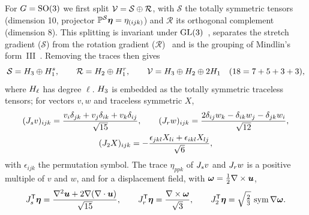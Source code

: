 For $G=\mathrm{SO}(3)$ we first split $\mathcal{V}=\mathcal S\oplus\mathcal R$, with $\mathcal S$ the
totally symmetric tensors (dimension 10, projector $\mathbb{P}^{\mathcal S}\bm{\eta}=\eta_{(ijk)}$)
and $\mathcal R$ its orthogonal complement (dimension 8). This splitting is invariant
under $\mathrm{GL}(3)$~\cite{Auffray2015,Lazar2016}, separates the stretch gradient
($\mathcal S$) from the rotation gradient ($\mathcal R$)~\cite{Auffray2015} and is the
grouping of Mindlin's form~III~\cite{MindlinEshel1968}. Removing the
traces then gives
\begin{equation}
\mathcal S=H_{3}\oplus H_{1}^{s},\qquad \mathcal R=H_{2}\oplus H_{1}^{r},\qquad
\mathcal{V}=H_{3}\oplus H_{2}\oplus2H_{1}\quad(18=7+5+3+3),\label{eq:iso-decomposition}
\end{equation}
where $H_{\ell}$ has degree $\ell$. $H_{3}$ is embedded as the totally symmetric
traceless tensors; for vectors $v,w$ and traceless symmetric $X$,
\begin{equation}
\begin{gathered}
(J_{s}v)_{ijk}=\frac{v_i\delta_{jk}+v_j\delta_{ik}+v_k\delta_{ij}}{\sqrt{15}},\qquad
(J_{r}w)_{ijk}=\frac{2\delta_{ij}w_k-\delta_{ik}w_j-\delta_{jk}w_i}{\sqrt{12}},\\
(J_{2}X)_{ijk}=-\frac{\epsilon_{jkl}X_{li}+\epsilon_{ikl}X_{lj}}{\sqrt6},
\end{gathered}\label{eq:iso-embeddings}
\end{equation}
with $\epsilon_{ijk}$ the permutation symbol. The trace $\eta_{ppk}$ of $J_{s}v$ and
$J_{r}w$ is a positive multiple of $v$ and $w$, and for a displacement field, with
$\bm\omega=\tfrac12\nabla\times\bm{u}$,
\begin{equation}
J_{s}^{\mathsf T}\bm{\eta}=\frac{\nabla^2\bm{u}+2\nabla(\nabla\cdot\bm{u})}{\sqrt{15}},\qquad
J_{r}^{\mathsf T}\bm{\eta}=\frac{\nabla\times\bm\omega}{\sqrt3},\qquad
J_{2}^{\mathsf T}\bm{\eta}=\sqrt{\tfrac23}\,\operatorname{sym}\nabla\bm\omega.\label{eq:iso-coordinates}
\end{equation}

